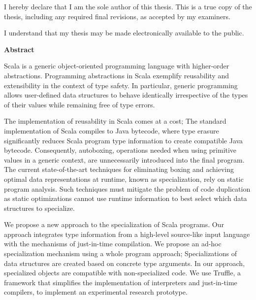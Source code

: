 \cleardoublepage %

  \noindent
I hereby declare that I am the sole author of this thesis. This is a true copy of the thesis, including any required final revisions, as accepted by my examiners.

  \bigskip
  
  \noindent
I understand that my thesis may be made electronically available to the public.

\cleardoublepage


\begin{center}\textbf{Abstract}\end{center}

Scala is a generic object-oriented programming language with higher-order abstractions. 
Programming abstractions in Scala exemplify reusability and extensibility in the context of type safety.
In particular, generic programming allows user-defined data structures to behave identically irrespective of the types of their values while remaining free of type errors.

The implementation of reusability in Scala comes at a cost; The standard implementation of Scala compiles to Java bytecode, where type erasure significantly reduces Scala program type information to create compatible Java bytecode.
Consequently, autoboxing, operations needed when using primitive values in a generic context, are unnecessarily introduced into the final program. 
The current state-of-the-art techniques for eliminating boxing and achieving optimal data representations at runtime, known as specialization, rely on static program analysis.
Such techniques must mitigate the problem of code duplication as static optimizations cannot use runtime information to best select which data structures to specialize.

We propose a new approach to the specialization of Scala programs.
Our approach integrates type information from a high-level source-like input language with the mechanisms of just-in-time compilation.
We propose an ad-hoc specialization mechanism using a whole program approach; Specializations of data structures are created based on concrete type arguments.
In our approach, specialized objects are compatible with non-specialized code.
We use Truffle, a framework that simplifies the implementation of interpreters and just-in-time compilers, to implement an experimental research prototype.

